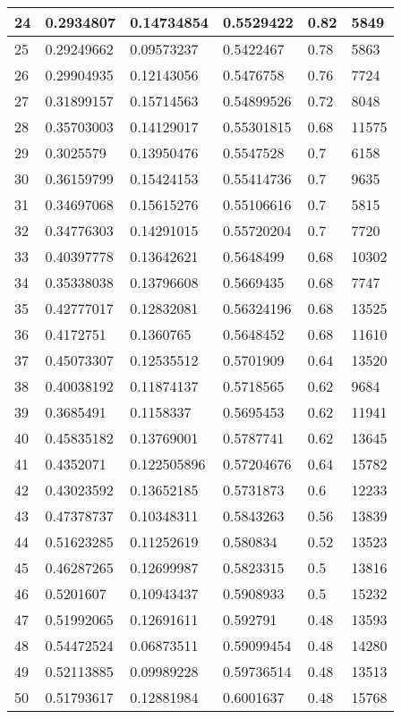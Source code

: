 \begin{longtable}{|l|l|l|l|l|l|}
24 & 0.2934807 & 0.14734854 & 0.5529422 & 0.82 & 5849 \\ \hline 
25 & 0.29249662 & 0.09573237 & 0.5422467 & 0.78 & 5863 \\ \hline 
26 & 0.29904935 & 0.12143056 & 0.5476758 & 0.76 & 7724 \\ \hline 
27 & 0.31899157 & 0.15714563 & 0.54899526 & 0.72 & 8048 \\ \hline 
28 & 0.35703003 & 0.14129017 & 0.55301815 & 0.68 & 11575 \\ \hline 
29 & 0.3025579 & 0.13950476 & 0.5547528 & 0.7 & 6158 \\ \hline 
30 & 0.36159799 & 0.15424153 & 0.55414736 & 0.7 & 9635 \\ \hline 
31 & 0.34697068 & 0.15615276 & 0.55106616 & 0.7 & 5815 \\ \hline 
32 & 0.34776303 & 0.14291015 & 0.55720204 & 0.7 & 7720 \\ \hline 
33 & 0.40397778 & 0.13642621 & 0.5648499 & 0.68 & 10302 \\ \hline 
34 & 0.35338038 & 0.13796608 & 0.5669435 & 0.68 & 7747 \\ \hline 
35 & 0.42777017 & 0.12832081 & 0.56324196 & 0.68 & 13525 \\ \hline 
36 & 0.4172751 & 0.1360765 & 0.5648452 & 0.68 & 11610 \\ \hline 
37 & 0.45073307 & 0.12535512 & 0.5701909 & 0.64 & 13520 \\ \hline 
38 & 0.40038192 & 0.11874137 & 0.5718565 & 0.62 & 9684 \\ \hline 
39 & 0.3685491 & 0.1158337 & 0.5695453 & 0.62 & 11941 \\ \hline 
40 & 0.45835182 & 0.13769001 & 0.5787741 & 0.62 & 13645 \\ \hline 
41 & 0.4352071 & 0.122505896 & 0.57204676 & 0.64 & 15782 \\ \hline 
42 & 0.43023592 & 0.13652185 & 0.5731873 & 0.6 & 12233 \\ \hline 
43 & 0.47378737 & 0.10348311 & 0.5843263 & 0.56 & 13839 \\ \hline 
44 & 0.51623285 & 0.11252619 & 0.580834 & 0.52 & 13523 \\ \hline 
45 & 0.46287265 & 0.12699987 & 0.5823315 & 0.5 & 13816 \\ \hline 
46 & 0.5201607 & 0.10943437 & 0.5908933 & 0.5 & 15232 \\ \hline 
47 & 0.51992065 & 0.12691611 & 0.592791 & 0.48 & 13593 \\ \hline 
48 & 0.54472524 & 0.06873511 & 0.59099454 & 0.48 & 14280 \\ \hline 
49 & 0.52113885 & 0.09989228 & 0.59736514 & 0.48 & 13513 \\ \hline 
50 & 0.51793617 & 0.12881984 & 0.6001637 & 0.48 & 15768 \\ \hline 
\end{longtable}